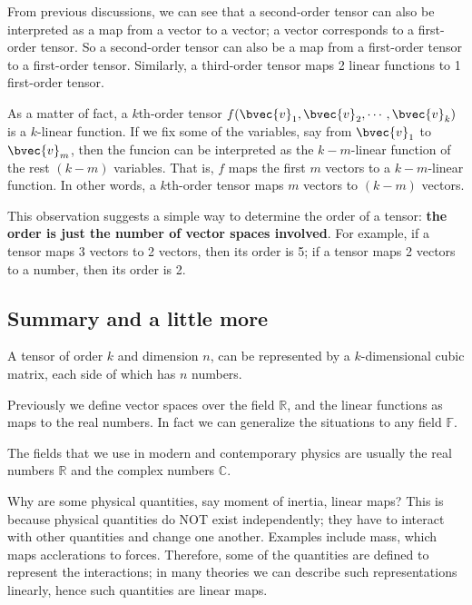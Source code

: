 From previous discussions, we can see that a second-order tensor can also be interpreted as a map from a vector to a vector; a vector corresponds to a first-order tensor. So a second-order tensor can also be a map from a first-order tensor to a first-order tensor. Similarly, a third-order tensor maps 2 linear functions to 1 first-order tensor. 


As a matter of fact, a $k$th-order tensor $f(\bvec{v}_1, \bvec{v}_2, \cdots,\bvec{v}_k)$ is a $k$-linear function. If we fix some of the variables, say from $\bvec{v}_1$ to $\bvec{v}_m$, then the funcion can be interpreted as the $k-m$-linear function of the rest $(k-m)$ variables. That is, $f$ maps the first $m$ vectors to a $k-m$-linear function. In other words, a $k$th-order tensor maps $m$ vectors to $(k-m)$ vectors. 

This observation suggests a simple way to determine the order of a tensor: \textbf{the order is just the number of vector spaces involved}. For example, if a tensor maps 3 vectors to 2 vectors, then its order is 5; if a tensor maps 2 vectors to a number, then its order is 2. 


\subsection{Summary and a little more}

A tensor of order $k$ and dimension $n$, can be represented by a $k$-dimensional cubic matrix, each side of which has $n$ numbers. 


Previously we define vector spaces over the field $\mathbb{R}$, and the linear functions as maps to the real numbers. In fact we can generalize the situations to any field $\mathbb{F}$. 

The fields that we use in modern and contemporary physics are usually the real numbers $\mathbb{R}$ and the complex numbers $\mathbb{C}$. 


Why are some physical quantities, say moment of inertia, linear maps? This is because physical quantities do NOT exist independently; they have to interact with other quantities and change one another. Examples include mass, which maps acclerations to forces. Therefore, some of the quantities are defined to represent the interactions; in many theories we can describe such representations linearly, hence such quantities are linear maps. 









